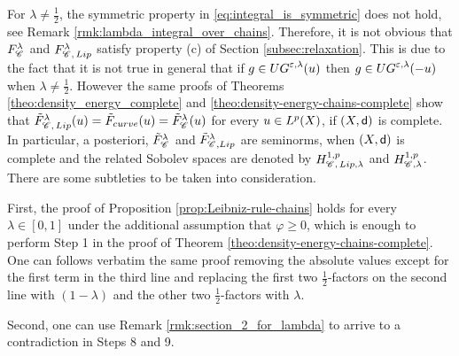 \documentclass[12pt]{amsart}
\newcommand{\sfd}{{\sf d}}
\newcommand{\X}{{\rm X}}
\newcommand{\Lip}{{\rm Lip}}
\newcommand{\F}{{\rm F}}
\theoremstyle{definition}
\newcommand{\Chain}[1]{\mathscr{C}^{#1}}
\newcommand{\UG}[1]{{\rm UG}^{#1}}
\newcommand{\HH}[2]{H^{1,#1}_{{\rm #2}}}
\renewcommand{\F}[1]{{\rm F}_{{\rm #1}}}
\newcommand{\relF}[1]{\tilde{\rm F}_{{\rm #1}}}
\begin{document}
        For $\lambda \neq \frac{1}{2}$, the symmetric property in \eqref{eq:integral_is_symmetric} does not hold, see Remark \ref{rmk:lambda_integral_over_chains}. Therefore, it is not obvious that $\F{\Chain{}}^\lambda$ and $\F{\Chain{},\,\Lip}^\lambda$ satisfy property (c) of Section \ref{subsec:relaxation}. This is due to the fact that it is not true in general that if $g\in \UG{\varepsilon,\lambda}(u)$ then $g \in \UG{\varepsilon,\lambda}(-u)$ when $\lambda \neq \frac12$. However the same proofs of Theorems \ref{theo:density_energy_complete} and \ref{theo:density-energy-chains-complete} show that $\relF{\Chain{},\,\Lip}^\lambda(u) = \relF{curve}(u) = \relF{\Chain{}}^\lambda(u)$ for every $u\in L^p(\X)$, if $(\X,\sfd)$ is complete. In particular, a posteriori, $\relF{\Chain{}}^\lambda$ and $\relF{\Chain{},\Lip}^\lambda$ are seminorms, when $(\X,\sfd)$ is complete and the related Sobolev spaces are denoted by $\HH{p}{\Chain{}, \, \Lip,\lambda}$ and $\HH{p}{\Chain{},\lambda}$. There are some subtleties to be taken into consideration.

        First, the proof of Proposition \ref{prop:Leibniz-rule-chains} holds for every $\lambda \in [0,1]$ under the additional assumption that $\varphi \ge 0$, which is enough to perform Step 1 in the proof of Theorem \ref{theo:density-energy-chains-complete}. One can follows verbatim the same proof removing the absolute values except for the first term in the third line and replacing the first two $\frac12$-factors on the second line with $(1-\lambda)$ and the other two $\frac12$-factors with $\lambda$.
        
        Second, one can use Remark \ref{rmk:section_2_for_lambda} to arrive to a contradiction in Steps 8 and 9.
        
\end{document}
